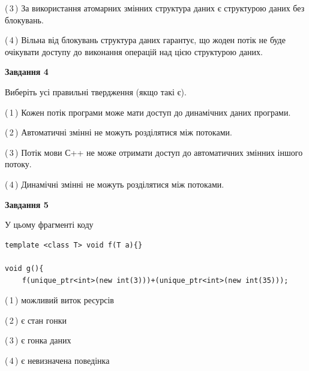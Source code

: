 \documentclass[12pt, ukrainian]{article}
\begin{document}
\begin {large}
{(\,3\,) За використання атомарних змінних структура даних є структурою даних без блокувань.%

(\,4\,) Вільна від блокувань структура даних гарантує, що жоден потік не буде очікувати доступу до виконання операцій над цією структурою даних.%



\begin{center}
\textbf{Завдання 4}
\end{center}
Виберіть усі правильні твердження (якщо такі є).\par
\vspace{2mm}

(\,1\,) Кожен потік програми може мати доступ до динамічних даних програми.%

(\,2\,) Автоматичні змінні не можуть розділятися між потоками.%

(\,3\,) Потік мови С++ не може отримати доступ до автоматичних змінних іншого потоку.%

(\,4\,) Динамічні змінні не можуть розділятися між потоками.%



\begin{center}
\textbf{Завдання 5}
\end{center}
У цьому фрагменті коду
\begin{verbatim}
template <class T> void f(T a){}

void g(){
    f(unique_ptr<int>(new int(3)))+(unique_ptr<int>(new int(35)));
\end{verbatim}

(\,1\,) можливий виток ресурсів%

(\,2\,) є стан гонки%

(\,3\,) є гонка даних%

(\,4\,) є невизначена поведінка%


}
\end {large}
\end{document}
